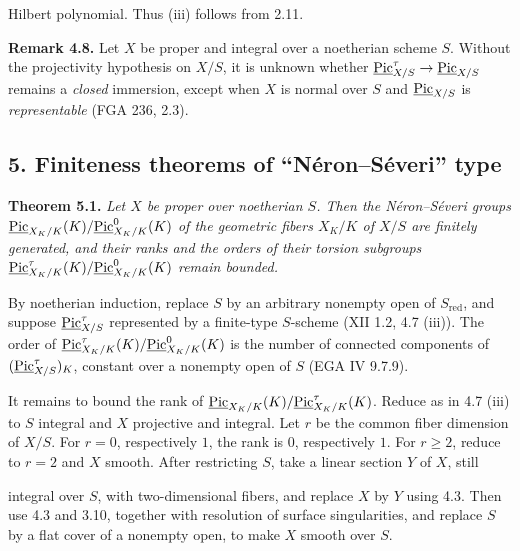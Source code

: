 Hilbert polynomial. Thus (iii) follows from 2.11.

\textbf{Remark 4.8.} Let \(X\) be proper and integral over a noetherian
scheme \(S\). Without the projectivity hypothesis on \(X/S\), it is
unknown whether
\(\underline{\operatorname{Pic}}^{\tau}_{X/S}\to\underline{\operatorname{Pic}}_{X/S}\) remains a
\emph{closed} immersion, except when \(X\) is normal over \(S\) and
\(\underline{\operatorname{Pic}}_{X/S}\) is \emph{representable} (FGA 236, 2.3).

\subsection*{5. Finiteness theorems of ``N\'eron--S\'everi'' type}

\textbf{Theorem 5.1.} \emph{Let \(X\) be proper over noetherian \(S\).
Then the N\'eron--S\'everi groups
\(\underline{\operatorname{Pic}}_{X_K/K}(K)/\underline{\operatorname{Pic}}^0_{X_K/K}(K)\) of the
geometric fibers \(X_K/K\) of \(X/S\) are finitely generated, and their
ranks and the orders of their torsion subgroups
\(\underline{\operatorname{Pic}}^\tau_{X_K/K}(K)/\underline{\operatorname{Pic}}^0_{X_K/K}(K)\)
remain bounded.}

By noetherian induction, replace \(S\) by an arbitrary nonempty open of
\(S_{\mathrm{red}}\), and suppose
\(\underline{\operatorname{Pic}}^{\tau}_{X/S}\) represented by a finite-type
\(S\)-scheme (XII 1.2, 4.7 (iii)). The order of
\(\underline{\operatorname{Pic}}^\tau_{X_K/K}(K)/\underline{\operatorname{Pic}}^0_{X_K/K}(K)\)
is the number of connected components of
\((\underline{\operatorname{Pic}}^{\tau}_{X/S})_K\), constant over a nonempty open of
\(S\) (EGA IV 9.7.9).

It remains to bound the rank of
\(\underline{\operatorname{Pic}}_{X_K/K}(K)/\underline{\operatorname{Pic}}^\tau_{X_K/K}(K)\).
Reduce as in 4.7 (iii) to
\(S\) integral and \(X\) projective and integral. Let \(r\) be the common
fiber dimension of \(X/S\). For \(r=0\), respectively \(1\), the rank is \(0\),
respectively \(1\). For \(r\ge2\), reduce to \(r=2\) and \(X\) smooth.
After restricting \(S\), take a linear section \(Y\) of \(X\), still

integral over \(S\), with two-dimensional fibers, and replace \(X\) by
\(Y\) using 4.3. Then use 4.3 and 3.10, together with resolution of
surface singularities, and replace \(S\) by a flat cover of a nonempty
open, to make \(X\) smooth over \(S\).

